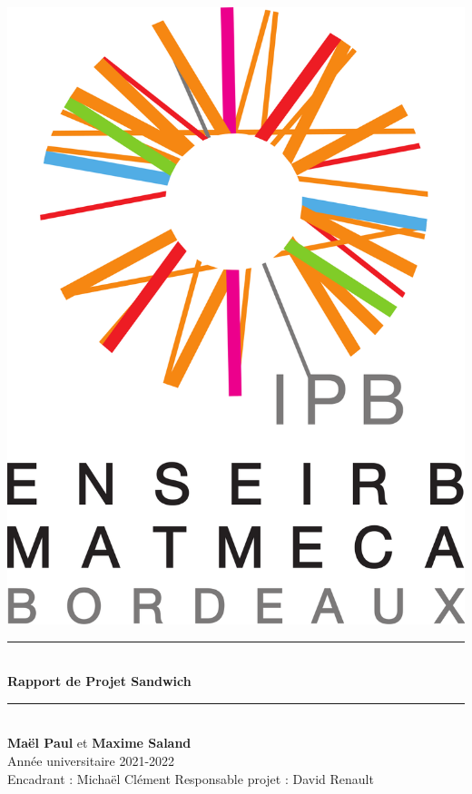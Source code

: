 \documentclass[a4paper]{article}
\author{Maël PAUL Maxime SALAND}
\newcommand{\HRule}{\rule{\linewidth}{0.5mm}}
\begin{document}
\begin{center}
\includegraphics[scale=0.15]{img/logo_EM_vertical.png}\\[1cm]
 \HRule \\[0.4cm]
{\huge \bfseries Rapport de Projet Sandwich \\[0.4cm]}
\HRule \\[1.5cm]
{\Large \textbf{Maël Paul} et \textbf{Maxime Saland}}\\[0.5cm]
{\Large Année universitaire 2021-2022}\\[1cm]
{\large Encadrant : Michaël Clément}
\hspace{0.5cm}
{\large Responsable projet : David Renault}

\end{center}

\thispagestyle{empty}

\newpage
\end{document}
